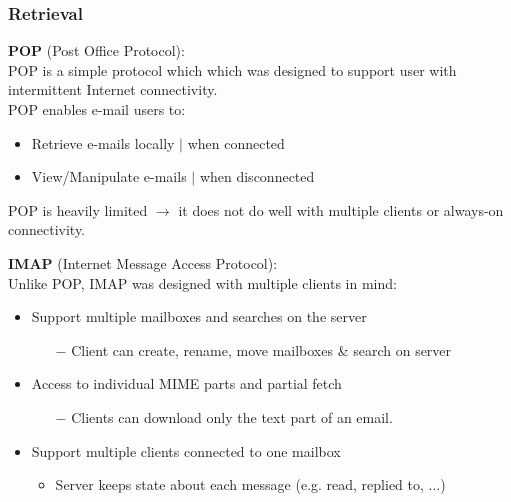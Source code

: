 \documentclass[a4paper, fontsize=8pt, landscape, DIV=1]{scrartcl}
\begin{document}
\begin{multicols*}{4}
		\subsubsection{Retrieval}
		\textbf{POP} (Post Office Protocol):\\
		POP is a simple protocol which which was designed to support user with intermittent Internet connectivity.\\
		POP enables e-mail users to:
		\begin{itemize}[noitemsep]
			\item Retrieve e-mails locally $\vert$ when connected
			\item View/Manipulate e-mails $\vert$ when disconnected
		\end{itemize} 
		POP is heavily limited $\rightarrow$ it does not do well with multiple clients or always-on connectivity.\par 
		
		\textbf{IMAP} (Internet Message Access Protocol):\\
		Unlike POP, IMAP was designed with multiple clients in mind: 
		\begin{itemize}[noitemsep]
			\item Support multiple mailboxes and searches on the server
			\begin{itemize}
				\item[$-$] Client can create, rename, move mailboxes \& search on server
			\end{itemize}
			\item Access to individual MIME parts and partial fetch
			\begin{itemize}
				\item[$-$] Clients can download only the text part of an email. 
			\end{itemize}
			\item Support multiple clients connected to one mailbox
			\begin{itemize}
				\item Server keeps state about each message (e.g. read, replied to, ...)
			\end{itemize}
		\end{itemize} 		
		\end{multicols*}
	\setcounter{secnumdepth}{3}
\end{document}
